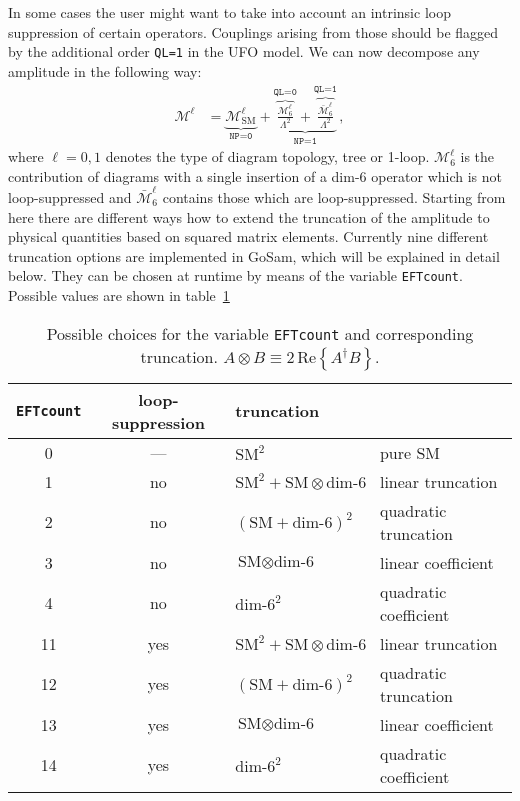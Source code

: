 \documentclass[11pt,a4paper]{refrep}
\def\M{\mathcal{M}}
\begin{document}
In some cases the user might want to take into account an intrinsic loop suppression of certain operators. Couplings arising from those should be flagged by the additional order \texttt{QL=1} in the UFO model. We can now decompose any amplitude in the following way:
\begin{align}
   \M^\ell &= \underbrace{\M^\ell_\mathrm{SM}}_{\displaystyle\texttt{NP=0}} + \underbrace{\overbrace{\frac{\M^\ell_6}{\Lambda^2}}^{\displaystyle\texttt{QL=0}}  + \overbrace{\frac{\bar{\M}^\ell_6}{\Lambda^2}}^{\displaystyle\texttt{QL=1}}}_{\displaystyle\texttt{NP=1}}\,,
\end{align}
where $\ell=0,1$ denotes the type of diagram topology, tree or 1-loop. $\M^\ell_6$ is the contribution of diagrams with a single insertion of a dim-6 operator which is not loop-suppressed and $\bar{\M}^\ell_6$ contains those which are loop-suppressed. Starting from here there are different ways how to extend the truncation of the amplitude to physical quantities based on squared matrix elements. Currently nine different truncation options are implemented in GoSam, which will be explained in detail below. They can be chosen at runtime by means of the variable \texttt{EFTcount}. Possible values are shown in table~\ref{tab:EFTcount}

\begin{table}
\renewcommand{\arraystretch}{1.5}
\begin{tabular}{c|c|l|l}
   \texttt{EFTcount} & loop-suppression & truncation & \\
\hline
   0 & --- & $\text{SM}^2$ & pure SM\\
\hline
   1 & no & $\text{SM}^2 + \text{SM}\otimes\text{dim-6}$ & linear truncation\\
   2 & no & $\left(\text{SM}+\text{dim-6}\right)^2$ & quadratic truncation\\
   3 & no & $\text{SM}\otimes\text{dim-6}$ & linear coefficient\\
   4 & no & $\text{dim-6}^2$ & quadratic coefficient\\
\hline
   11 & yes & $\text{SM}^2 + \text{SM}\otimes\text{dim-6}$ & linear truncation\\
   12 & yes & $\left(\text{SM}+\text{dim-6}\right)^2$ & quadratic truncation\\
   13 & yes & $\text{SM}\otimes\text{dim-6}$ & linear coefficient\\
   14 & yes & $\text{dim-6}^2$ & quadratic coefficient
\end{tabular}
\caption{Possible choices for the variable \texttt{EFTcount} and corresponding truncation. $A\otimes B\equiv2\,\mathrm{Re}\left\{A^\dagger B\right\}$.}
\label{tab:EFTcount}
\renewcommand{\arraystretch}{1.0}
\end{table}
\end{document}
